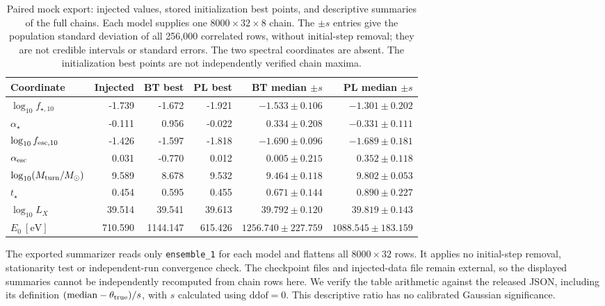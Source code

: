 \begin{table}[t]\centering\small
\caption{Paired mock export: injected values, stored initialization best points, and descriptive summaries of the full chains. Each model supplies one $8000\times32\times8$ chain. The $\pm s$ entries give the population standard deviation of all 256,000 correlated rows, without initial-step removal; they are not credible intervals or standard errors. The two spectral coordinates are absent. The initialization best points are not independently verified chain maxima.}\label{tab:paired-recovery}
\begin{tabular*}{\textwidth}{@{\extracolsep{\fill}}lrrrrr}\toprule
Coordinate & Injected & BT best & PL best & BT median $\pm s$ & PL median $\pm s$\\\midrule
$\log_{10}f_{\star,10}$ & -1.739 & -1.672 & -1.921 & $-1.533\pm0.106$ & $-1.301\pm0.202$\\
$\alpha_\star$ & -0.111 & 0.956 & -0.022 & $0.334\pm0.208$ & $-0.331\pm0.111$\\
$\log_{10}f_{{\rm esc},10}$ & -1.426 & -1.597 & -1.818 & $-1.690\pm0.096$ & $-1.689\pm0.181$\\
$\alpha_{\rm esc}$ & 0.031 & -0.770 & 0.012 & $0.005\pm0.215$ & $0.352\pm0.118$\\
$\log_{10}(M_{\rm turn}/M_\odot)$ & 9.589 & 8.678 & 9.532 & $9.464\pm0.118$ & $9.802\pm0.053$\\
$t_\star$ & 0.454 & 0.595 & 0.455 & $0.671\pm0.144$ & $0.890\pm0.227$\\
$\log_{10}L_X$ & 39.514 & 39.541 & 39.613 & $39.792\pm0.120$ & $39.819\pm0.143$\\
$E_0\ [\mathrm{eV}]$ & 710.590 & 1144.147 & 615.426 & $1256.740\pm227.759$ & $1088.545\pm183.159$\\
\bottomrule\end{tabular*}\end{table}

The exported summarizer reads only \texttt{ensemble\_1} for each model and flattens all $8000\times32$ rows. It applies no initial-step removal, stationarity test or independent-run convergence check. The checkpoint files and injected-data file remain external, so the displayed summaries cannot be independently recomputed from chain rows here. We verify the table arithmetic against the released JSON, including its definition $(\mathrm{median}-\theta_{\rm true})/s$, with $s$ calculated using $\mathrm{ddof}=0$. This descriptive ratio has no calibrated Gaussian significance.

